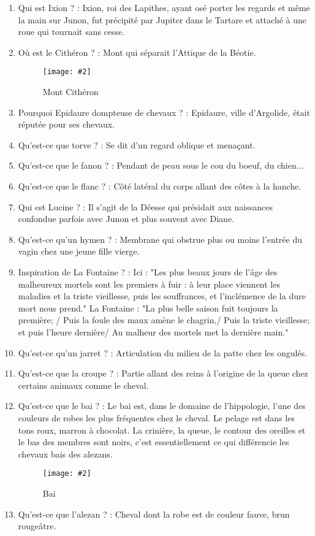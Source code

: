 \documentclass[a4paper, 11pt, hidelinks]{article}
\newcommand{\img}[4]{\begin{figure}[!ht]
    \centering
    \texttt{[image: \#2]}
    \caption{#3}
    \label{#4}
    \end{figure} }
\begin{document}
\begin{enumerate}
      \item Qui est Ixion ? : Ixion, roi des Lapithes, ayant osé porter les regards et même la main sur Junon, fut précipité par Jupiter dans le Tartare et attaché à une roue qui tournait sans cesse.
      \item Où est le Cithéron ? : Mont qui séparait l'Attique de la Béotie.
            \img{0.4}{Cithéron.png}{Mont Cithéron}{116}
            \newpage
      \item Pourquoi Epidaure dompteuse de chevaux ? : Epidaure, ville d'Argolide, était réputée pour ses chevaux.
      \item Qu'est-ce que torve ? : Se dit d'un regard oblique et menaçant.
      \item Qu'est-ce que le fanon ? : Pendant de peau sous le cou du boeuf, du chien...
      \item Qu'est-ce que le flanc ? : Côté latéral du corps allant des côtes à la hanche.
      \item Qui est Lucine ? : Il s'agit de la Déesse qui présidait aux naissances confondue parfois avec Junon et plus souvent avec Diane.
      \item Qu'est-ce qu'un hymen ? : Membrane qui obstrue plus ou moins l'entrée du vagin chez une jeune fille vierge.
      \item Inspiration de La Fontaine ? : Ici : "Les plus beaux jours de l'âge des malheureux mortels sont les premiers à fuir : à leur place viennent les maladies et la triste vieillesse,
            puis les souffrances, et l'inclémence de la dure mort nous prend." La Fontaine : "La plus belle saison fuit toujours la première; /
            Puis la foule des maux amène le chagrin,/ Puis la triste vieillesse; et puis l'heure dernière/ Au malheur des mortels met la dernière main."
      \item Qu'est-ce qu'un jarret ? : Articulation du milieu de la patte chez les ongulés.
      \item Qu'est-ce que la croupe ? : Partie allant des reins à l'origine de la queue chez certains animaux comme le cheval.
      \item Qu'est-ce que le bai ? : Le bai est, dans le domaine de l'hippologie, l'une des couleurs de robes les plus fréquentes chez le cheval. Le pelage est dans les tons roux, marron à chocolat.
            La crinière, la queue, le contour des oreilles et le bas des membres sont noirs, c'est essentiellement ce qui différencie les chevaux bais des alezans.
            \img{0.5}{Bai.jpg}{Bai}{117}
      \item Qu'est-ce que l'alezan ? : Cheval dont la robe est de couleur fauve, brun rougeâtre.

\end{enumerate}
\end{document}
